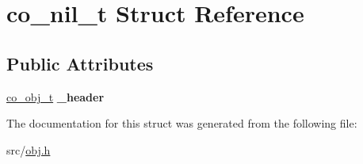 \hypertarget{structco__nil__t}{\section{co\-\_\-nil\-\_\-t Struct Reference}
\label{structco__nil__t}
}
\subsection*{Public Attributes}
\begin{DoxyCompactItemize}
\item 
\hypertarget{structco__nil__t_a52c9fe1d7b0baa291783dbccadbda6e9}{\hyperlink{structco__obj__t}{co\-\_\-obj\-\_\-t} {\bfseries \-\_\-header}}\label{structco__nil__t_a52c9fe1d7b0baa291783dbccadbda6e9}

\end{DoxyCompactItemize}


The documentation for this struct was generated from the following file\-:\begin{DoxyCompactItemize}
\item 
src/\hyperlink{obj_8h}{obj.\-h}\end{DoxyCompactItemize}

